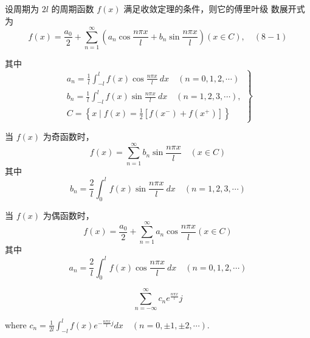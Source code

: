 \begin{theorem}
    设周期为 $ 2 l $ 的周期函数 $ f(x) $ 满足收敛定理的条件，则它的傅里叶级 数展开式为
\begin{equation}
f(x)=\frac{a_{0}}{2}+\sum_{n=1}^{\infty}\left(a_{n} \cos \frac{n \pi x}{l}+b_{n} \sin \frac{n \pi x}{l}\right)(x \in C), \quad(8-1)
\end{equation}

其中
\begin{equation}
\left.\begin{array}{l}
a_{n}=\frac{1}{l} \int_{-l}^{l} f(x) \cos \frac{n \pi x}{l} {~d} x \quad(n=0,1,2, \cdots) \\
b_{n}=\frac{1}{l} \int_{-l}^{l} f(x) \sin \frac{n \pi x}{l} {~d} x \quad(n=1,2,3, \cdots), \\
C=\left\{x \mid f(x)=\frac{1}{2}\left[f\left(x^{-}\right)+f\left(x^{+}\right)\right]\right\}
\end{array}\right\}
\end{equation}



当 $ f(x) $ 为奇函数时，
\begin{equation}
f(x)=\sum_{n=1}^{\infty} b_{n} \sin \frac{n \pi x}{l} \quad(x \in C)
\end{equation}
其中
\begin{equation}
b_{n}=\frac{2}{l} \int_{0}^{l} f(x) \sin \frac{n \pi x}{l} {~d} x \quad(n=1,2,3, \cdots)
\end{equation}

当 $ f(x) $ 为偶函数时，
\begin{equation}
f(x)=\frac{a_{0}}{2}+\sum_{n=1}^{\infty} a_{n} \cos \frac{n \pi x}{l}(x \in C)
\end{equation}
其中
\begin{equation}
a_{n}=\frac{2}{l} \int_{0}^{l} f(x) \cos \frac{n \pi x}{l} {~d} x \quad(n=0,1,2, \cdots)
\end{equation}
\end{theorem}

\begin{definition}[傅里叶级数的复数形式]
    \begin{equation} \sum_{n=-\infty}^{\infty} c_{n} {e}^{\frac{n \pi x}{l}}j \end{equation}

    where $c_{n}=\frac{1}{2 l} \int_{-l}^{l} f(x) {e}^{-\frac{n \pi x}{l} j} {d} x \quad(n=0, \pm 1, \pm 2, \cdots) $.
\end{definition}

